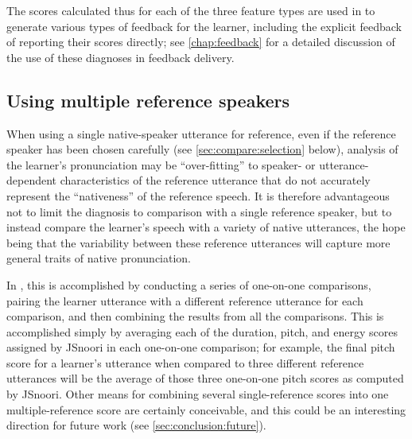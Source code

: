 	



	\vspace{2em}
	
	The scores calculated thus for each of the three feature types are used in  to generate various types of feedback for the learner, including the explicit feedback of reporting their scores directly; see \cref{chap:feedback} for a detailed discussion of the use of these diagnoses in feedback delivery.


	\subsection{Using multiple reference speakers}
	\label{sec:compare:multi}
	
	When using a single native-speaker utterance for reference, even if the reference speaker has been chosen carefully (see \cref{sec:compare:selection} below), analysis of the learner's pronunciation may be ``over-fitting'' to speaker- or utterance-dependent characteristics of the reference utterance that do not accurately represent the ``nativeness'' of the reference speech. It is therefore advantageous not to limit the diagnosis to comparison with a single reference speaker, but to instead compare the learner's speech with a variety of native utterances, the hope being that the variability between these reference utterances will capture more general traits of native pronunciation.
	
	In , this is accomplished by conducting a series of one-on-one comparisons, pairing the learner utterance with a different reference utterance for each comparison, and then combining the results from all the comparisons. This is accomplished simply by averaging each of the duration, pitch, and energy scores assigned by JSnoori in each one-on-one comparison; for example, the final pitch score for a learner's utterance when compared to three different reference utterances will be the average of those three one-on-one pitch scores as computed by JSnoori. Other means for combining several single-reference scores into one multiple-reference score are certainly conceivable, and this could be an interesting direction for future work (see \cref{sec:conclusion:future}).
	

